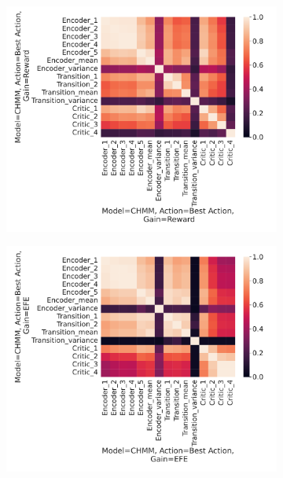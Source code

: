 \documentclass[twoside,11pt]{article}
\begin{document}
\begin{figure}[H]
    \centering
    \begin{subfigure}{.3\textwidth}
        \centering
        \includegraphics[draft=false,width=\linewidth]{cka_figures/CKA_chmm_127_chmm_127}
        \caption{}\label{sfig:cka-chmm-chmm-ba}
    \end{subfigure}%
    \begin{subfigure}{.3\textwidth}
        \centering
        \includegraphics[draft=false,width=\linewidth]{cka_figures/CKA_chmm_131_chmm_131}

\end{subfigure}
\end{figure}
\end{document}
